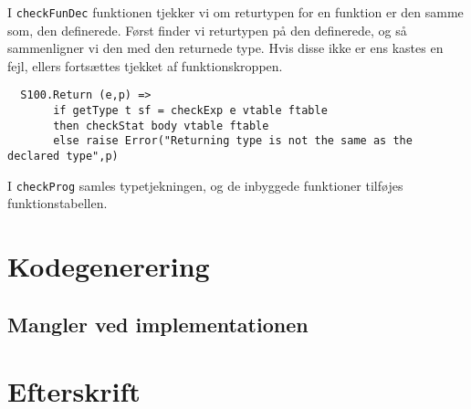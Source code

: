 \documentclass[12pt]{article}
\begin{document}
I \texttt{checkFunDec} funktionen tjekker vi om returtypen for en funktion er den samme som, den definerede. Først finder vi returtypen på den definerede, og så sammenligner vi den med den returnede type. Hvis disse ikke er ens kastes en fejl, ellers fortsættes tjekket af funktionskroppen.

\begin{verbatim}
  S100.Return (e,p) => 
       if getType t sf = checkExp e vtable ftable
       then checkStat body vtable ftable
       else raise Error("Returning type is not the same as the declared type",p)
\end{verbatim}

I \texttt{checkProg} samles typetjekningen, og de inbyggede funktioner tilføjes funktionstabellen.

\section{Kodegenerering}



\subsection{Mangler ved implementationen}

\section{Efterskrift}

{}

\end{document}

